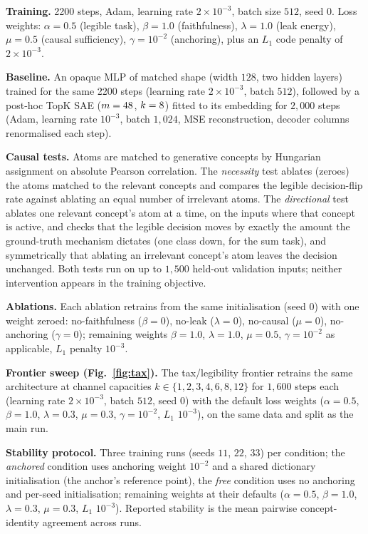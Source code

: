 \documentclass[11pt]{article}
\providecommand{\plantedSteps}{2200}
\begin{document}
\textbf{Training.} \plantedSteps{} steps, Adam, learning rate $2\times10^{-3}$, batch
size $512$, seed $0$. Loss weights: $\alpha=0.5$ (legible task), $\beta=1.0$
(faithfulness), $\lambda=1.0$ (leak energy), $\mu=0.5$ (causal sufficiency),
$\gamma=10^{-2}$ (anchoring), plus an $L_1$ code penalty of $2\times10^{-3}$.

\textbf{Baseline.} An opaque MLP of matched shape (width $128$, two hidden layers)
trained for the same \plantedSteps{} steps (learning rate $2\times10^{-3}$, batch
$512$), followed by a post-hoc TopK SAE ($m=48$, $k=8$) fitted to its
embedding for $2{,}000$ steps (Adam, learning rate $10^{-3}$, batch $1{,}024$, MSE
reconstruction, decoder columns renormalised each step).

\textbf{Causal tests.} Atoms are matched to generative concepts by Hungarian
assignment on absolute Pearson correlation. The \emph{necessity} test ablates (zeroes)
the atoms matched to the relevant concepts and compares the legible decision-flip rate
against ablating an equal number of irrelevant atoms. The \emph{directional} test
ablates one relevant concept's atom at a time, on the inputs where that concept is
active, and checks that the legible decision moves by exactly the amount the
ground-truth mechanism dictates (one class down, for the sum task), and symmetrically
that ablating an irrelevant concept's atom leaves the decision unchanged. Both tests
run on up to $1{,}500$ held-out validation inputs; neither intervention appears in the
training objective.

\textbf{Ablations.} Each ablation retrains from the same initialisation (seed $0$)
with one weight zeroed: no-faithfulness ($\beta=0$), no-leak ($\lambda=0$), no-causal
($\mu=0$), no-anchoring ($\gamma=0$); remaining weights $\beta=1.0$, $\lambda=1.0$,
$\mu=0.5$, $\gamma=10^{-2}$ as applicable, $L_1$ penalty $10^{-3}$.

\textbf{Frontier sweep (Fig.~\ref{fig:tax}).} The tax/legibility frontier retrains the
same architecture at channel capacities $k\in\{1,2,3,4,6,8,12\}$ for $1{,}600$ steps
each (learning rate $2\times10^{-3}$, batch $512$, seed $0$) with the default loss
weights ($\alpha=0.5$, $\beta=1.0$, $\lambda=0.3$, $\mu=0.3$, $\gamma=10^{-2}$, $L_1$
$10^{-3}$), on the same data and split as the main run.

\textbf{Stability protocol.} Three training runs (seeds $11$, $22$, $33$) per
condition; the \emph{anchored} condition uses anchoring weight $10^{-2}$ and a shared
dictionary initialisation (the anchor's reference point), the \emph{free} condition
uses no anchoring and per-seed initialisation; remaining weights at their defaults
($\alpha=0.5$, $\beta=1.0$, $\lambda=0.3$, $\mu=0.3$, $L_1$ $10^{-3}$). Reported
stability is the mean pairwise concept-identity agreement across runs.
\end{document}
